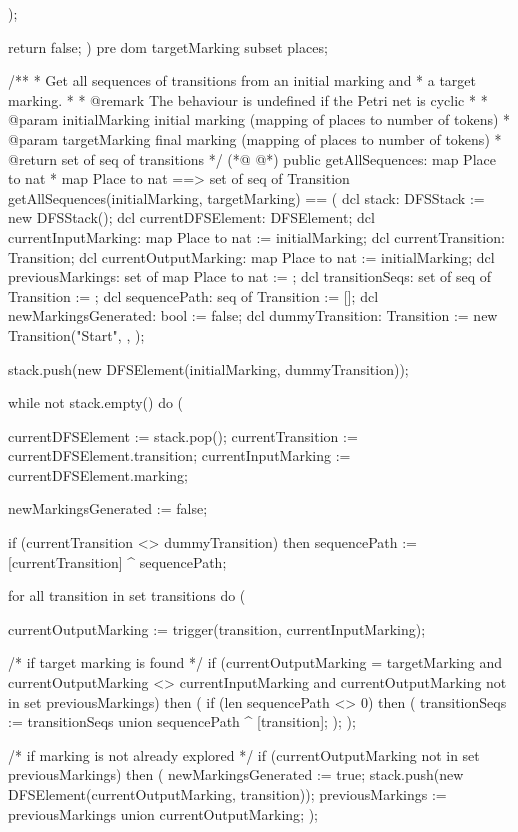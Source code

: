 \begin{vdmpp}
      );

      return false;
    )
    pre dom targetMarking subset places;

    /**
     * Get all sequences of transitions from an initial marking and
     * a target marking.
     *
     * @remark The behaviour is undefined if the Petri net is cyclic
     *
     * @param initialMarking initial marking (mapping of places to number of tokens)
     * @param targetMarking final marking (mapping of places to number of tokens)
     * @return set of seq of transitions
     */
(*@
\label{getAllSequences:181}
@*)
    public getAllSequences: map Place to nat * map Place to nat ==> set of seq of Transition
    getAllSequences(initialMarking, targetMarking) == (
      dcl stack: DFSStack := new DFSStack();
      dcl currentDFSElement: DFSElement;
      dcl currentInputMarking: map Place to nat := initialMarking;
      dcl currentTransition: Transition;
      dcl currentOutputMarking: map Place to nat := initialMarking;
      dcl previousMarkings: set of map Place to nat := {};
      dcl transitionSeqs: set of seq of Transition := {};
      dcl sequencePath: seq of Transition := [];
      dcl newMarkingsGenerated: bool := false;
      dcl dummyTransition: Transition := new Transition("Start", { }, { });

      stack.push(new DFSElement(initialMarking, dummyTransition));

      while not stack.empty() do (

        currentDFSElement := stack.pop();
        currentTransition := currentDFSElement.transition;
        currentInputMarking := currentDFSElement.marking;

        newMarkingsGenerated := false;

        if (currentTransition <> dummyTransition) then
          sequencePath := [currentTransition] ^ sequencePath;

        for all transition in set transitions do (

          currentOutputMarking := trigger(transition, currentInputMarking);

          /* if target marking is found */
          if (currentOutputMarking = targetMarking and
           currentOutputMarking <> currentInputMarking and
           currentOutputMarking not in set previousMarkings) then (
            if (len sequencePath <> 0) then (
              transitionSeqs := transitionSeqs union {sequencePath ^ [transition]};
            );
          );

          /* if marking is not already explored */
          if (currentOutputMarking not in set previousMarkings) then (
            newMarkingsGenerated := true;
            stack.push(new DFSElement(currentOutputMarking, transition));
            previousMarkings := previousMarkings union {currentOutputMarking};
          );


\end{vdmpp}
